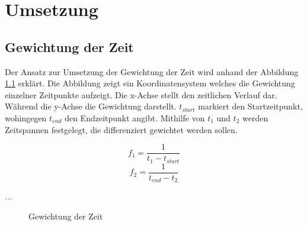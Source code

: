 
\chapter{Umsetzung}

\section{Gewichtung der Zeit}

Der Ansatz zur Umsetzung der Gewichtung der Zeit wird anhand der Abbildung \ref{fig:umsetzung:gewichtungderzeit} erklärt. Die Abbildung zeigt ein Koordinatensystem welches die Gewichtung einzelner Zeitpunkte aufzeigt. Die x-Achse stellt den zeitlichen Verlauf dar. Während die y-Achse die Gewichtung darstellt. $t_{start}$ markiert den Startzeitpunkt, wohingegen $t_{end}$ den Endzeitpunkt angibt. Mithilfe von $t_1$ und $t_2$ werden Zeitspannen festgelegt, die differenziert gewichtet werden sollen. 

\begin{equation}
f_1 = \frac{1}{t_1 - t_{start}}
\end{equation}
\begin{equation}
f_2 = \frac{1}{t_{end} - t_2}
\end{equation}

...

\begin{figure}[htbp]
\begin{center}
\end{center}
\caption{Gewichtung der Zeit}
\label{fig:umsetzung:gewichtungderzeit}
\end{figure}

